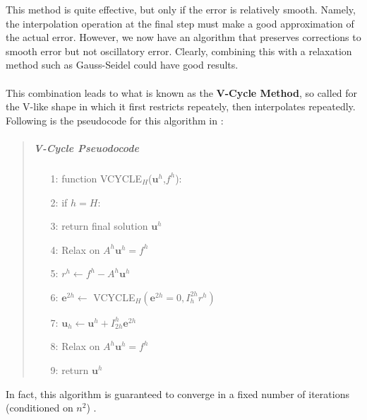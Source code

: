 \vspace{.2in}
This method is quite effective, but only if the error is relatively smooth. Namely, the interpolation operation at the final step must make a good approximation of the actual error. However, we now have an algorithm that preserves corrections to smooth error but not oscillatory error. Clearly, combining this with a relaxation method such as Gauss-Seidel could have good results.
\\\\
This combination leads to what is known as the \textbf{V-Cycle Method}, so called for the V-like shape in which it first restricts repeately, then interpolates repeatedly. Following is the pseudocode for this algorithm in \cite{lee14}:
\vspace{-.2in}
\begin{quote}
\item
\pagebreak
\subparagraph{V-Cycle Pseuodocode}
\begin{enumerate}
\item[1:] function VCYCLE$_H$($\textbf{u}^h$,$f^h$):
\item[2:] \hspace{.2in} if $h=H$:
\item[3:] \hspace{.4in} return final solution $\textbf{u}^h$
\item[4:] \hspace{.2in} Relax on $A^h\textbf{u}^h=f^h$
\item[5:] \hspace{.2in} $r^{h}\leftarrow f^h-
						A^h\textbf{u}^h$
\item[6:] \hspace{.2in} $\textbf{e}^{2h}\leftarrow$
						VCYCLE$_H(\textbf{e}^{2h}=0,
						I_h^{2h}r^h)$
\item[7:] \hspace{.2in} $\textbf{u}_h\leftarrow
						\textbf{u}^h+I_{2h}^h
						\textbf{e}^{2h}$
\item[8:] \hspace{.2in} Relax on $A^h\textbf{u}^h=f^h$
\item[9:] \hspace{.2in} return $\textbf{u}^h$
\end{enumerate}
\end{quote}
\vspace{.2in}
In fact, this algorithm is guaranteed to converge in a fixed number of iterations (conditioned on $n^2$) \cite{gopal08}.